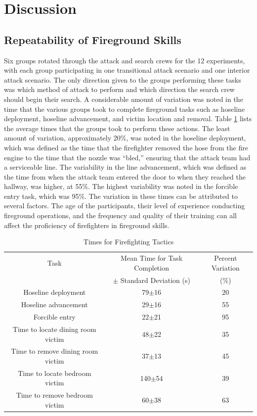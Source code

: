 \documentclass[12pt,oneside]{article}
\begin{document}
\section{Discussion}

\subsection{Repeatability of Fireground Skills}
\label{subsec:ff_repeatability}

 Six groups rotated through the attack and search crews for the 12 experiments, with each group participating in one transitional attack scenario and one interior attack scenario. The only direction given to the groups performing these tasks was which method of attack to perform and which direction the search crew should begin their search. A considerable amount of variation was noted in the time that the various groups took to complete fireground tasks such as hoseline deployment, hoseline advancement, and victim location and removal. Table \ref{tab:ff_tasks} lists the average times that the groups took to perform these actions. The least amount of variation, approximately 20\%, was noted in the hoseline deployment, which was defined as the time that the firefighter removed the hose from the fire engine to the time that the nozzle was ``bled,'' ensuring that the attack team had a serviceable line. The variability in the line advancement, which was defined as the time from when the attack team entered the door to when they reached the hallway, was higher, at 55\%. The highest variability was noted in the forcible entry task, which was  95\%. The variation in these times can be attributed to several factors. The age of the participants, their level of experience conducting fireground operations, and the frequency and quality of their training can all affect the proficiency of firefighters in fireground skills. 

\begin{table}[!ht]
    \centering
    \caption{Times for Firefighting Tactics}
    \label{tab:ff_tasks}
    \begin{tabular}{ccc}
    \toprule[1.5pt]
 	Task&								Mean Time for Task Completion  	&Percent Variation\\
 		&								$\pm$ Standard Deviation (s)	&	(\%)		\\
 	\midrule 
  	Hoseline deployment					&	79$\pm$16					&	20\\
  	Hoseline advancement				&	29$\pm$16					&	55\\
  	Forcible entry						&	22$\pm$21					&	95\\
  	Time to locate dining room victim 	&	48$\pm$22					&	35\\
  	Time to remove dining room victim 	&	37$\pm$13					&	45\\
  	Time to locate bedroom victim 		&	140$\pm$54					&	39\\
  	Time to remove bedroom victim 		&	60$\pm$38					&	63\\  	
 	\bottomrule[1.25pt] 
    \end{tabular}
\end{table}
\end{document}

